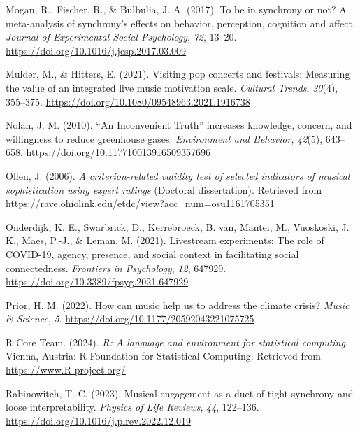 \documentclass[
  man,floatsintext]{apa6}
\newlength{\cslhangindent}
\newenvironment{CSLReferences}[2] %
 {\begin{list}{}{%
  \setlength{\itemindent}{0pt}
  \setlength{\leftmargin}{0pt}
  \setlength{\parsep}{0pt}
  \ifodd #1
   \setlength{\leftmargin}{\cslhangindent}
   \setlength{\itemindent}{-1\cslhangindent}
  \fi
  \setlength{\itemsep}{#2\baselineskip}}}
 {\end{list}}
\begin{document}
\begin{CSLReferences}{1}{0}
Mogan, R., Fischer, R., \& Bulbulia, J. A. (2017). To be in synchrony or not? {A} meta-analysis of synchrony's effects on behavior, perception, cognition and affect. \emph{Journal of Experimental Social Psychology}, \emph{72}, 13--20. \url{https://doi.org/10.1016/j.jesp.2017.03.009}

Mulder, M., \& Hitters, E. (2021). Visiting pop concerts and festivals: Measuring the value of an integrated live music motivation scale. \emph{Cultural Trends}, \emph{30}(4), 355--375. \url{https://doi.org/10.1080/09548963.2021.1916738}

Nolan, J. M. (2010). {``{An} {Inconvenient} {Truth}''} increases knowledge, concern, and willingness to reduce greenhouse gases. \emph{Environment and Behavior}, \emph{42}(5), 643--658. \url{https://doi.org/10.117710013916509357696}

Ollen, J. (2006). \emph{A criterion-related validity test of selected indicators of musical sophistication using expert ratings} (Doctoral dissertation). Retrieved from \url{https://rave.ohiolink.edu/etdc/view?acc_num=osu1161705351}

Onderdijk, K. E., Swarbrick, D., Kerrebroeck, B. van, Mantei, M., Vuoskoski, J. K., Maes, P.-J., \& Leman, M. (2021). Livestream experiments: {The} role of {COVID}-19, agency, presence, and social context in facilitating social connectedness. \emph{Frontiers in Psychology}, \emph{12}, 647929. \url{https://doi.org/10.3389/fpsyg.2021.647929}

Prior, H. M. (2022). How can music help us to address the climate crisis? \emph{Music \& Science}, \emph{5}. \url{https://doi.org/10.1177/20592043221075725}

R Core Team. (2024). \emph{R: A language and environment for statistical computing}. Vienna, Austria: R Foundation for Statistical Computing. Retrieved from \url{https://www.R-project.org/}

Rabinowitch, T.-C. (2023). Musical engagement as a duet of tight synchrony and loose interpretability. \emph{Physics of Life Reviews}, \emph{44}, 122--136. \url{https://doi.org/10.1016/j.plrev.2022.12.019}


\end{CSLReferences}
\end{document}
